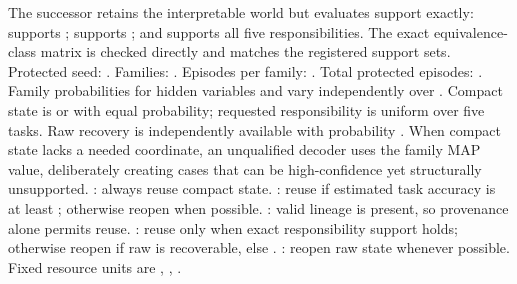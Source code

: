 \markdownRendererDocumentBegin
\markdownRendererSectionBegin
{}\markdownRendererInterblockSeparator
{}The successor retains the interpretable world but evaluates support exactly:  supports ;  supports ; and  supports all five responsibilities. The exact equivalence-class matrix is checked directly and matches the registered support sets.\markdownRendererInterblockSeparator
{}Protected seed: . Families: . Episodes per family: . Total protected episodes: .\markdownRendererInterblockSeparator
{}Family probabilities for hidden variables  and  vary independently over \markdownRendererCodeSpan{[0.65,0.95]}. Compact state is  or  with equal probability; requested responsibility is uniform over five tasks. Raw recovery is independently available with probability . When compact state lacks a needed coordinate, an unqualified decoder uses the family MAP value, deliberately creating cases that can be high-confidence yet structurally unsupported.\markdownRendererInterblockSeparator
{}\markdownRendererSectionBegin
{}\markdownRendererInterblockSeparator
{}\markdownRendererOlBeginTight
{}: always reuse compact state.\markdownRendererOlItemEnd 
{}: reuse if estimated task accuracy is at least ; otherwise reopen when possible.\markdownRendererOlItemEnd 
{}: valid lineage is present, so provenance alone permits reuse.\markdownRendererOlItemEnd 
{}: reuse only when exact responsibility support holds; otherwise reopen if raw is recoverable, else .\markdownRendererOlItemEnd 
{}: reopen raw state whenever possible.\markdownRendererOlItemEnd 
\markdownRendererOlEndTight \markdownRendererInterblockSeparator
{}Fixed resource units are , , .
\markdownRendererSectionEnd 
\markdownRendererSectionEnd \markdownRendererDocumentEnd